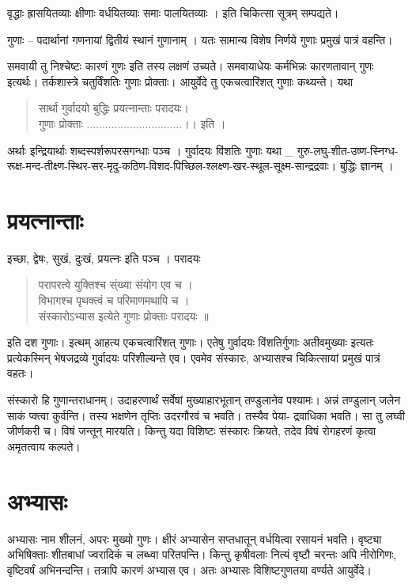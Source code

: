 वृद्धाः ह्रासयितव्याः क्षीणाः वर्धयितव्याः समाः पालयितव्याः । इति चिकित्सा सूत्रम् सम्पद्यते।

गुणाः – पदार्थानां गणनायां द्वितीयं स्थानं गुणानाम् । यतः सामान्य विशेष निर्णये गुणाः प्रमुखं पात्रं वहन्ति।

समवायी तु निश्चेष्टः कारणं गुणः इति तस्य लक्षणं उच्यते। समवायाधेयः कर्मभिन्नः कारणतावान् गुणः इत्यर्थः। तर्कशास्त्रे चतुर्विंशतिः गुणाः प्रोक्ताः। आयुर्वेदे तु एकचत्वारिंशत् गुणाः कथ्यन्ते। यथा
\begin{verse}
सार्था गुर्वादयो बुद्धिः प्रयत्नान्ताः परादयः।\\
गुणाः प्रोक्ताः ...............................।। इति ।
\end{verse}
अर्थाः इन्द्रियार्थाः शब्दस्पर्शरूपरसगन्धाः पञ्च । गुर्वादयः विंशतिः गुणाः यथा \_ गुरु-लघु-शीत-उष्ण-स्निग्ध- रूक्ष-मन्द-तीक्ष्ण-स्थिर-सर-मृदु-कठिण-विशद-पिच्छिल-श्लक्ष्ण-खर-स्थूल-सूक्ष्म-सान्द्रद्रवाः। बुद्धिः ज्ञानम् ।

\section*{प्रयत्नान्ताः}

इच्छा, द्वेषः, सुखं, दुःखं, प्रयत्नः इति पञ्च । परादयः
\begin{verse}
परापरत्वे युक्तिश्च स्ंख्या संयोग एव च ।\\
विभागश्च पृथक्त्वं च परिमाणमथापि च ।\\
संस्कारोऽभ्यास इत्येते गुणाः प्रोक्ताः परादयः ॥
\end{verse}
इति दश गुणाः। इत्थम् आहत्य एकचत्वारिंशत् गुणाः। एतेषु गुर्वादयः विंशतिर्गुणाः अतीवमुख्याः इत्यतः प्रत्येकस्मिन् भेषजद्रव्ये गुर्वादयः परिशील्यन्ते एव। एवमेव संस्कारः, अभ्यासश्च चिकित्सायां प्रमुखं पात्रं वहतः।

संस्कारो हि गुणान्तराधानम्। उदाहरणार्थं सर्वेषां मुख्याहारभूतान् तण्डुलानेव पश्यामः। अन्नं तण्डुलान् जलेन साकं प्क्त्वा कुर्वन्ति। तस्य भक्षणेन तृप्तिः उदरगौरवं च भवति। तस्यैव पेया-  द्रवाधिका भवति। सा तु लघ्वी जीर्णकरी च। विषं जन्तून् मारयति। किन्तु यदा विशिष्टः संस्कारः क्रियते, तदेव विषं रोगहरणं कृत्वा अमृतत्वाय कल्पते।

\section*{अभ्यासः}

अभ्यासः नाम शीलनं, अपरः मुख्यो गुणः। क्षीरं अभ्यासेन सप्तधातून् वर्धयित्वा रसायनं भवति। वृष्ट्या अभिषिक्ताः शीतबाधां ज्वरादिकं च लब्ध्वा परितपन्ति। किन्तु कृषीवलाः नित्यं वृष्टौ चरन्तः अपि नीरोगिणः, वृष्टिवर्षं अभिनन्दन्ति। तत्रापि कारणं अभ्यास एव। अतः अभ्यासः विशिष्टगुणतया वर्ण्यते आयुर्वेदे।

